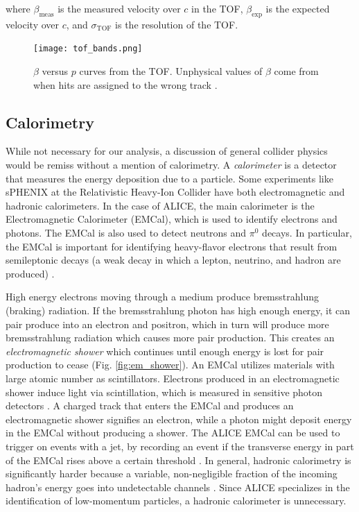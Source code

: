 \documentclass[../main.tex]{subfiles}
\begin{document}
where $\beta_{\text{meas}}$ is the measured velocity over $c$ in the TOF, $\beta_{\text{exp}}$ is the expected velocity over $c$, and $\sigma_{\text{TOF}}$ is the resolution of the TOF.


\begin{figure}[h]
    \centering
    \texttt{[image: tof\_bands.png]}
    \caption{$\beta$ versus $p$ curves from the TOF. Unphysical values of $\beta$ come from when hits are assigned to the wrong track \cite{Carnesecchi:2018oss}.}
    \label{fig:tof_bands}
\end{figure}

\subsection{Calorimetry}
While not necessary for our analysis, a discussion of general collider physics would be remiss without a mention of calorimetry. A \textit{calorimeter} is a detector that measures the energy deposition due to a particle. Some experiments like sPHENIX at the Relativistic Heavy-Ion Collider have both electromagnetic and hadronic calorimeters. In the case of ALICE, the main calorimeter is the Electromagnetic Calorimeter (EMCal), which is used to identify electrons and photons. The EMCal is also used to detect neutrons and $\pi^0$ decays. In particular, the EMCal is important for identifying heavy-flavor electrons that result from semileptonic decays (a weak decay in which a lepton, neutrino, and hadron are produced) \cite{ALICE:performance}.

High energy electrons moving through a medium produce bremsstrahlung (braking) radiation. If the bremsstrahlung photon has high enough energy, it can pair produce into an electron and positron, which in turn will produce more bremsstrahlung radiation which causes more pair production. This creates an \textit{electromagnetic shower} which continues until enough energy is lost for pair production to cease (Fig. \ref{fig:em_shower}).  An EMCal utilizes materials with large atomic number as scintillators. Electrons produced in an electromagnetic shower induce light via scintillation, which is measured in sensitive photon detectors \cite{Thomson:particle}. A charged track that enters the EMCal and produces an electromagnetic shower signifies an electron, while a photon might deposit energy in the EMCal without producing a shower. The ALICE EMCal can be used to trigger on events with a jet, by recording an event if the transverse energy in part of the EMCal rises above a certain threshold \cite{ALICE:performance}. In general, hadronic calorimetry is significantly harder because a variable, non-negligible fraction of the incoming hadron's energy goes into undetectable channels \cite{detectors}. Since ALICE specializes in the identification of low-momentum particles, a hadronic calorimeter is unnecessary. 
\end{document}
